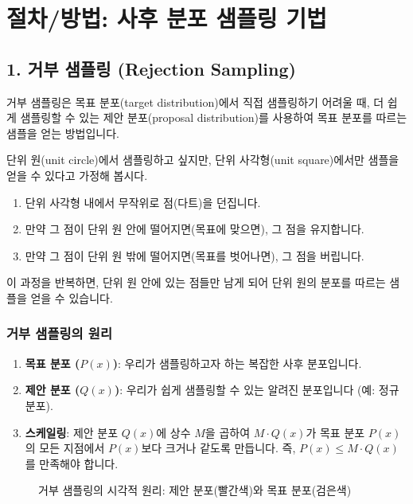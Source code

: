 \documentclass[11pt,a4paper]{article}
\theoremstyle{definition}
\newcommand{\newsection}[1]{\newpage\section{#1}}
\begin{document}
\newsection{절차/방법: 사후 분포 샘플링 기법}

\subsection*{1. 거부 샘플링 (Rejection Sampling)}
거부 샘플링은 목표 분포(target distribution)에서 직접 샘플링하기 어려울 때, 더 쉽게 샘플링할 수 있는 제안 분포(proposal distribution)를 사용하여 목표 분포를 따르는 샘플을 얻는 방법입니다.

\begin{examplebox}[title=거부 샘플링 비유: 다트 던지기]
단위 원(unit circle)에서 샘플링하고 싶지만, 단위 사각형(unit square)에서만 샘플을 얻을 수 있다고 가정해 봅시다.
\begin{enumerate}
    \item 단위 사각형 내에서 무작위로 점(다트)을 던집니다.
    \item 만약 그 점이 단위 원 안에 떨어지면(목표에 맞으면), 그 점을 유지합니다.
    \item 만약 그 점이 단위 원 밖에 떨어지면(목표를 벗어나면), 그 점을 버립니다.
\end{enumerate}
이 과정을 반복하면, 단위 원 안에 있는 점들만 남게 되어 단위 원의 분포를 따르는 샘플을 얻을 수 있습니다.
\end{examplebox}

\subsubsection*{거부 샘플링의 원리}
\begin{enumerate}
    \item \textbf{목표 분포 ($P(x)$)}: 우리가 샘플링하고자 하는 복잡한 사후 분포입니다.
    \item \textbf{제안 분포 ($Q(x)$)}: 우리가 쉽게 샘플링할 수 있는 알려진 분포입니다 (예: 정규 분포).
    \item \textbf{스케일링}: 제안 분포 $Q(x)$에 상수 $M$을 곱하여 $M \cdot Q(x)$가 목표 분포 $P(x)$의 모든 지점에서 $P(x)$보다 크거나 같도록 만듭니다. 즉, $P(x) \le M \cdot Q(x)$를 만족해야 합니다.
\end{enumerate}

\begin{figure}[h!]
    \centering
    \caption{거부 샘플링의 시각적 원리: 제안 분포(빨간색)와 목표 분포(검은색)}
    \label{fig:rejection_sampling_visual}
\end{figure}
\end{document}

